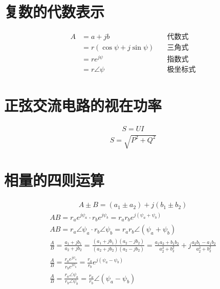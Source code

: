 \documentclass{ctexart}
\begin{document}
\section{复数的代数表示}
\begin{align*}
A &= a + jb \quad &\text{代数式} \\
  &= r(\cos\psi + j\sin\psi) \quad &\text{三角式} \\
  &= re^{j\psi} \quad &\text{指数式} \\
  &= r\angle\psi \quad &\text{极坐标式}
\end{align*}

\section{正弦交流电路的视在功率}
\begin{gather*}
S = UI
\end{gather*}
\begin{gather*}
S = \sqrt{P^2 + Q^2}
\end{gather*}

\newpage

\section{相量的四则运算}
\begin{gather*}
A \pm B = (a_1 \pm a_2) + j(b_1 \pm b_2)
\end{gather*}
\begin{gather*}
AB = r_{a}e^{j \psi_a} \cdot r_{b}e^{j \psi_b} = r_{a}r_{b}e^{j(\psi_a + \psi_b)} \\
AB = r_a\angle\psi_a \cdot r_b\angle\psi_b = r_{a}r_{b}\angle(\psi_a + \psi_b) \\
\frac{A}{B} = \frac{a_1 + jb_1}{a_2 + jb_2} = \frac{(a_1 + jb_1)(a_2 - jb_2)}{(a_2 + jb_2)(a_2 - jb_2)} = \frac{a_{1}a_{2} + b_{1}b_{2}}{a^2_2 + b^2_2} + j\frac{a_{2}b_{1} - a_{1}b_{2}}{a^2_2 + b^2_2} \\
\frac{A}{B} = \frac{r_{a}e^{j\psi_a}}{r_{b}e^{j\psi_b}} = \frac{r_a}{r_b}e^{j(\psi_a - \psi_b)} \\
\frac{A}{B} = \frac{r_a\angle\psi_a}{r_b\angle\psi_b} = \frac{r_a}{r_b}\angle(\psi_a - \psi_b)
\end{gather*}
\end{document}
